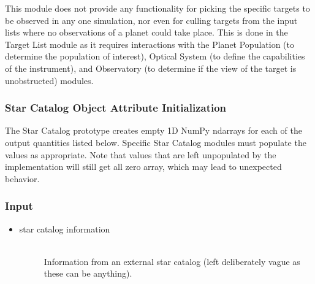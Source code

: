 \documentclass[cleanfoot]{asme2ej}
\begin{document}
This module does not provide any functionality for picking the specific targets to be observed in any one simulation, nor even for culling targets from the input lists where no observations of a planet could take place.  This is done in the Target List module as it requires interactions with the Planet Population (to determine the population of interest), Optical System (to define the capabilities of the instrument), and Observatory (to determine if the view of the target is unobstructed) modules.

\subsubsection{Star Catalog Object Attribute Initialization} 
The Star Catalog prototype creates empty 1D NumPy ndarrays for each of the output quantities listed below.  Specific Star Catalog modules must populate the values as appropriate.  Note that values that are left unpopulated by the implementation will still get all zero array, which may lead to unexpected behavior.

\subsubsection*{Input}
\begin{itemize}
\item 
\begin{description}
    \item[star catalog information] \hfill \\
    Information from an external star catalog (left deliberately vague as these can be anything).
\end{description}
\end{itemize}
\end{document}
